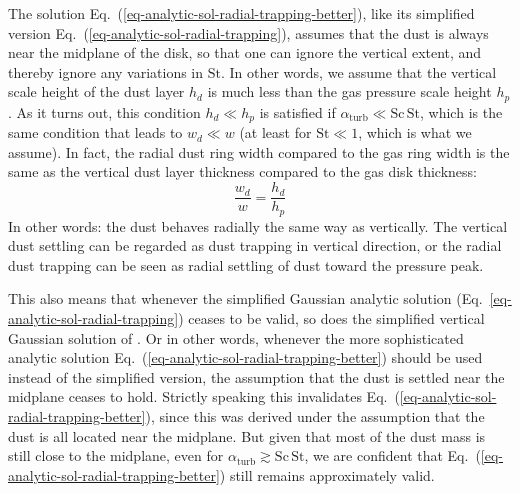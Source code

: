 \documentclass{aa}
\begin{document}
The solution Eq.~(\ref{eq-analytic-sol-radial-trapping-better}), like its
simplified version Eq.~(\ref{eq-analytic-sol-radial-trapping}), assumes that the
dust is always near the midplane of the disk, so that one can ignore the
vertical extent, and thereby ignore any variations in $\mathrm{St}$. In other
words, we assume that the vertical scale height of the dust layer $h_d$ is much
less than the gas pressure scale height $h_p$. As it turns out, this condition
$h_d\ll h_p$ is satisfied if $\alpha_{\mathrm{turb}}\ll
\mathrm{Sc}\,\mathrm{St}$, which is the same condition that leads to $w_d\ll w$
(at least for $\mathrm{St}\ll 1$, which is what we assume).
In fact, the radial dust ring width compared to the gas ring width is the
same as the vertical dust layer thickness compared to the gas disk thickness:
\begin{equation}
\frac{w_d}{w} = \frac{h_d}{h_p}
\end{equation}
In other words: the dust behaves radially the same way as vertically. The
vertical dust settling can be regarded as dust trapping in vertical direction,
or the radial dust trapping can be seen as radial settling of dust toward
the pressure peak.

This also means that whenever the simplified Gaussian analytic solution
(Eq.~\ref{eq-analytic-sol-radial-trapping}) ceases to be valid, so does the
simplified vertical Gaussian solution of \citet{1995Icar..114..237D}. Or in
other words, whenever the more sophisticated analytic solution
Eq.~(\ref{eq-analytic-sol-radial-trapping-better}) should be used instead of the
simplified version, the assumption that the dust is settled near the midplane
ceases to hold. Strictly speaking this invalidates
Eq.~(\ref{eq-analytic-sol-radial-trapping-better}), since this was derived under
the assumption that the dust is all located near the midplane. But given that
most of the dust mass is still close to the midplane, even for
$\alpha_{\mathrm{turb}}\gtrsim \mathrm{Sc}\,\mathrm{St}$, we are confident that
Eq.~(\ref{eq-analytic-sol-radial-trapping-better}) still remains approximately
valid.
\end{document}
